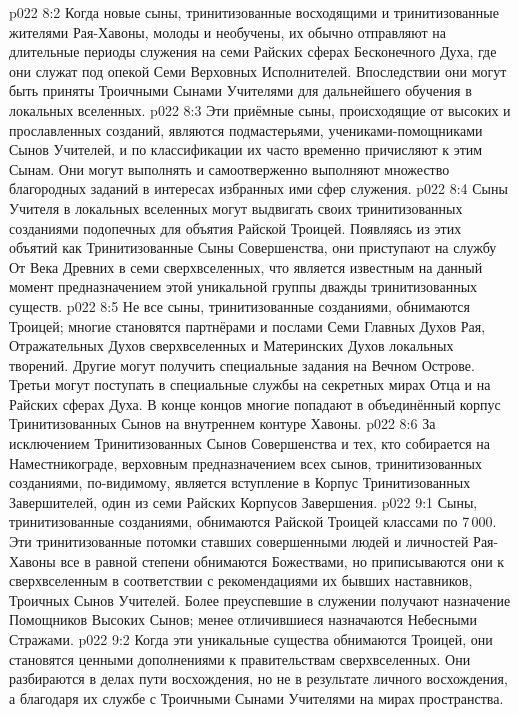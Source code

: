 \vs p022 8:2 \pc Когда новые сыны, тринитизованные восходящими и тринитизованные жителями Рая\hyp{}Хавоны, молоды и необучены, их обычно отправляют на длительные периоды служения на семи Райских сферах Бесконечного Духа, где они служат под опекой Семи Верховных Исполнителей. Впоследствии они могут быть приняты Троичными Сынами Учителями для дальнейшего обучения в локальных вселенных.
\vs p022 8:3 Эти приёмные сыны, происходящие от высоких и прославленных созданий, являются подмастерьями, учениками\hyp{}помощниками Сынов Учителей, и по классификации их часто временно причисляют к этим Сынам. Они могут выполнять и самоотверженно выполняют множество благородных заданий в интересах избранных ими сфер служения.
\vs p022 8:4 Сыны Учителя в локальных вселенных могут выдвигать своих тринитизованных созданиями подопечных для объятия Райской Троицей. Появляясь из этих объятий как Тринитизованные Сыны Совершенства, они приступают на службу От Века Древних в семи сверхвселенных, что является известным на данный момент предназначением этой уникальной группы дважды тринитизованных существ.
\vs p022 8:5 Не все сыны, тринитизованные созданиями, обнимаются Троицей; многие становятся партнёрами и послами Семи Главных Духов Рая, Отражательных Духов сверхвселенных и Материнских Духов локальных творений. Другие могут получить специальные задания на Вечном Острове. Третьи могут поступать в специальные службы на секретных мирах Отца и на Райских сферах Духа. В конце концов многие попадают в объединённый корпус Тринитизованных Сынов на внутреннем контуре Хавоны.
\vs p022 8:6 За исключением Тринитизованных Сынов Совершенства и тех, кто собирается на Наместникограде, верховным предназначением всех сынов, тринитизованных созданиями, по\hyp{}видимому, является вступление в Корпус Тринитизованных Завершителей, один из семи Райских Корпусов Завершения.
\vs p022 9:1 Сыны, тринитизованные созданиями, обнимаются Райской Троицей классами по 7\,000. Эти тринитизованные потомки ставших совершенными людей и личностей Рая\hyp{}Хавоны все в равной степени обнимаются Божествами, но приписываются они к сверхвселенным в соответствии с рекомендациями их бывших наставников, Троичных Сынов Учителей. Более преуспевшие в служении получают назначение Помощников Высоких Сынов; менее отличившиеся назначаются Небесными Стражами.
\vs p022 9:2 Когда эти уникальные существа обнимаются Троицей, они становятся ценными дополнениями к правительствам сверхвселенных. Они разбираются в делах пути восхождения, но не в результате личного восхождения, а благодаря их службе с Троичными Сынами Учителями на мирах пространства.
